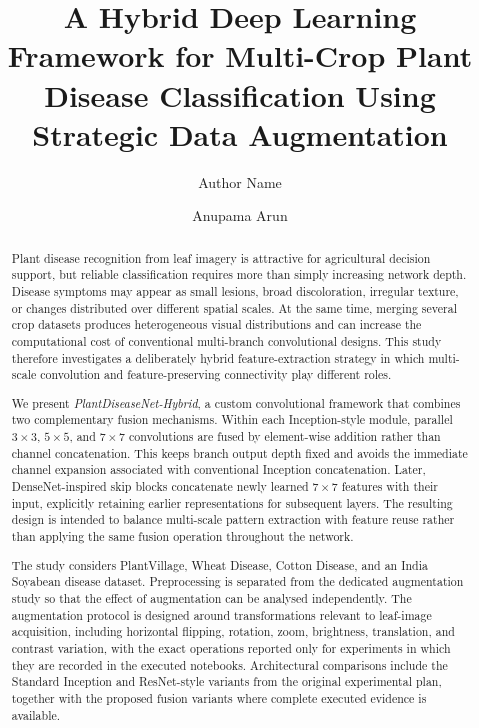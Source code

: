 \documentclass[a4paper,fleqn]{cas-dc}
\begin{document}
\let\WriteBookmarks\relax
{}
\title[mode=title]{A Hybrid Deep Learning Framework for Multi-Crop Plant Disease Classification Using Strategic Data Augmentation}
\author[1]{Author Name}
\author[1]{Anupama Arun}

\begin{abstract}
Plant disease recognition from leaf imagery is attractive for agricultural decision support, but reliable classification requires more than simply increasing network depth. Disease symptoms may appear as small lesions, broad discoloration, irregular texture, or changes distributed over different spatial scales. At the same time, merging several crop datasets produces heterogeneous visual distributions and can increase the computational cost of conventional multi-branch convolutional designs. This study therefore investigates a deliberately hybrid feature-extraction strategy in which multi-scale convolution and feature-preserving connectivity play different roles.

We present \textit{PlantDiseaseNet-Hybrid}, a custom convolutional framework that combines two complementary fusion mechanisms. Within each Inception-style module, parallel $3\times3$, $5\times5$, and $7\times7$ convolutions are fused by element-wise addition rather than channel concatenation. This keeps branch output depth fixed and avoids the immediate channel expansion associated with conventional Inception concatenation. Later, DenseNet-inspired skip blocks concatenate newly learned $7\times7$ features with their input, explicitly retaining earlier representations for subsequent layers. The resulting design is intended to balance multi-scale pattern extraction with feature reuse rather than applying the same fusion operation throughout the network.

The study considers PlantVillage, Wheat Disease, Cotton Disease, and an India Soyabean disease dataset. Preprocessing is separated from the dedicated augmentation study so that the effect of augmentation can be analysed independently. The augmentation protocol is designed around transformations relevant to leaf-image acquisition, including horizontal flipping, rotation, zoom, brightness, translation, and contrast variation, with the exact operations reported only for experiments in which they are recorded in the executed notebooks. Architectural comparisons include the Standard Inception and ResNet-style variants from the original experimental plan, together with the proposed fusion variants where complete executed evidence is available.


\end{abstract}
\end{document}
